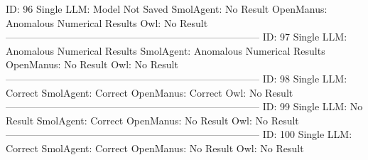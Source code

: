 \begin{tcolorbox}[colback=cadmiumgreen!5!white,colframe=forestgreen!75!white,breakable,title=\textit{Human evaluation results in task 4.}]
\begin{VerbatimWrap}
ID: 96 
Single LLM: Model Not Saved 
SmolAgent: No Result 
OpenManus: Anomalous Numerical Results 
Owl: No Result 
-----------------------------------------------------------------------------
ID: 97 
Single LLM: Anomalous Numerical Results 
SmolAgent: Anomalous Numerical Results 
OpenManus: No Result 
Owl: No Result 
-----------------------------------------------------------------------------
ID: 98 
Single LLM: Correct 
SmolAgent: Correct 
OpenManus: Correct 
Owl: No Result 
-----------------------------------------------------------------------------
ID: 99 
Single LLM: No Result 
SmolAgent: Correct 
OpenManus: No Result 
Owl: No Result 
-----------------------------------------------------------------------------
ID: 100 
Single LLM: Correct 
SmolAgent: Correct 
OpenManus: No Result 
Owl: No Result 
\end{VerbatimWrap}
\end{tcolorbox}